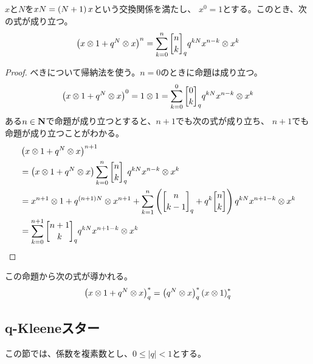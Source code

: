 {	\begin{proposition}[Schutzenbergerの公式その二]
	\label{prop:Schutzenbergerの公式その二} %
		$x$と$N$を$xN=\mathinner{\left({N+1}\right)}x$という交換関係を満たし、
		$x^0=1$とする。このとき、次の式が成り立つ。
		\begin{equation*}\begin{split}
			\plr{x\otimes1 + q^N\otimes x}^n = \sum_{k=0}^n\qbinom{n}{k}_q
			q^{kN}x^{n-k}\otimes x^k
		\end{split}\end{equation*}
	\end{proposition} %
	\begin{proof} %
		べきについて帰納法を使う。$n=0$のときに命題は成り立つ。
		\begin{equation*}\begin{split}
			\plr{x\otimes1 + q^N\otimes x}^0 = 1\otimes1
			= \sum_{k=0}^0\qbinom{0}{k}_q q^{kN}x^{n-k}\otimes x^k
		\end{split}\end{equation*}
		ある$n\in\mathbf{N}$で命題が成り立つとすると、$n+1$でも次の式が成り立ち、
		$n+1$でも命題が成り立つことがわかる。
		\begin{equation*}\begin{split}
			&\plr{x\otimes1 + q^N\otimes x}^{n+1} \\
			&= \plr{x\otimes1 + q^N\otimes x}
				\sum_{k=0}^n \qbinom{n}{k}_q q^{kN}x^{n-k}\otimes x^k \\
			&= x^{n+1}\otimes1 + q^{\plr{n+1}N}\otimes x^{n+1} 
				+ \sum_{k=1}^n \plr{\qbinom{n}{k-1}_q + q^k\qbinom{n}{k}}
				q^{kN}x^{n+1-k}\otimes x^k \\
			&= \sum_{k=0}^{n+1} \qbinom{n+1}{k}_q q^{kN}x^{n+1-k}\otimes x^k
		\end{split}\end{equation*}
	\end{proof} %

	この命題から次の式が導かれる。
	\begin{equation*}\begin{split}
		\mathinner{\left({x\otimes1 + q^N\otimes x}\right)}_q^* = \mathinner{\left({q^N\otimes x}\right)}_q^*
			\mathinner{\left({x\otimes1}\right)}_q^*
	\end{split}\end{equation*}
\subsection{q-Kleeneスター}\label{s2:q-Kleeneスター} %
	この節では、係数を複素数とし、$0\le|q|<1$とする。

}
